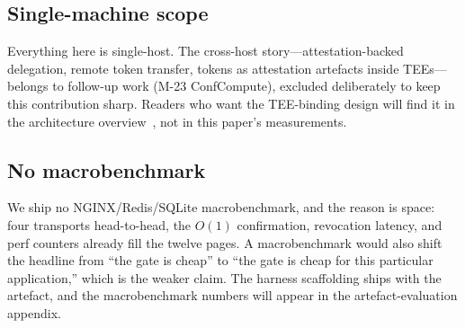 \subsection{Single-machine scope}
\label{sec:disc:scope}

Everything here is single-host. The cross-host
story---attestation-backed delegation, remote token transfer, tokens
as attestation artefacts inside TEEs---belongs to follow-up work
(M-23 ConfCompute), excluded deliberately to keep this contribution
sharp. Readers who want the TEE-binding design will find it in the
architecture overview~\cite{astra-confcompute}, not in this paper's
measurements.

\subsection{No macrobenchmark}
\label{sec:disc:macro}

We ship no NGINX/Redis/SQLite macrobenchmark, and the reason is
space: four transports head-to-head, the $O(1)$ confirmation,
revocation latency, and perf counters already fill the twelve pages.
A macrobenchmark would also shift the headline from ``the gate is
cheap'' to ``the gate is cheap for this particular application,''
which is the weaker claim. The harness scaffolding ships with the
artefact, and the macrobenchmark numbers will appear in the
artefact-evaluation appendix.

